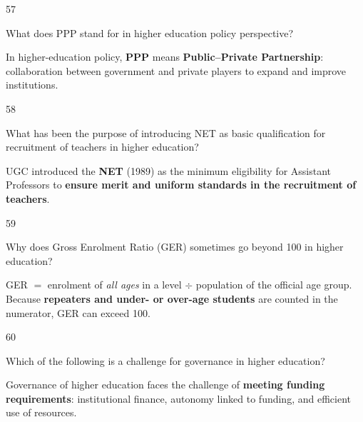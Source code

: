 \begin{question}{57}
{What does PPP stand for in higher education policy perspective?\par}
\begin{explain}
In higher-education policy, \textbf{PPP} means \textbf{Public--Private Partnership}: collaboration between government and private players to expand and improve institutions.
\end{explain}
\end{question}

\begin{question}{58}
{What has been the purpose of introducing NET as basic qualification for recruitment of teachers in higher education?\par}
\begin{explain}
UGC introduced the \textbf{NET} (1989) as the minimum eligibility for Assistant Professors to \textbf{ensure merit and uniform standards in the recruitment of teachers}.
\end{explain}
\end{question}

\begin{question}{59}
{Why does Gross Enrolment Ratio (GER) sometimes go beyond 100 in higher education?\par}
\begin{explain}
GER $=$ enrolment of \emph{all ages} in a level $\div$ population of the official age group. Because \textbf{repeaters and under- or over-age students} are counted in the numerator, GER can exceed 100.
\end{explain}
\end{question}

\begin{question}{60}
{Which of the following is a challenge for governance in higher education?\par}
\begin{explain}
Governance of higher education faces the challenge of \textbf{meeting funding requirements}: institutional finance, autonomy linked to funding, and efficient use of resources.
\end{explain}
\end{question}
